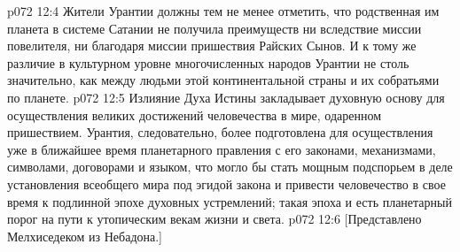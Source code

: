 \vs p072 12:4 \pc Жители Урантии должны тем не менее отметить, что родственная им планета в системе Сатании не получила преимуществ ни вследствие миссии повелителя, ни благодаря миссии пришествия Райских Сынов. И к тому же различие в культурном уровне многочисленных народов Урантии не столь значительно, как между людьми этой континентальной страны и их собратьями по планете.
\vs p072 12:5 Излияние Духа Истины закладывает духовную основу для осуществления великих достижений человечества в мире, одаренном пришествием. Урантия, следовательно, более подготовлена для осуществления уже в ближайшее время планетарного правления с его законами, механизмами, символами, договорами и языком, что могло бы стать мощным подспорьем в деле установления всеобщего мира под эгидой закона и привести человечество в свое время к подлинной эпохе духовных устремлений; такая эпоха и есть планетарный порог на пути к утопическим векам жизни и света.
\vsetoff
\vs p072 12:6 [Представлено Мелхиседеком из Небадона.]

